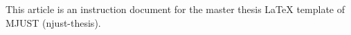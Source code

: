 \begin{abstract}
本文是南京理工大学硕士学位论文\LaTeX{}模板（njust-thesis）的使用说明文档。


\end{abstract}

\begin{englishabstract}
This article is an instruction document for the master thesis \LaTeX{} template of MJUST (njust-thesis).


\end{englishabstract}